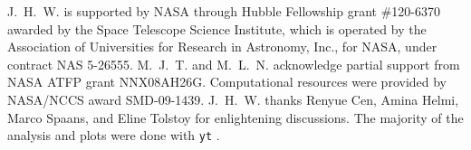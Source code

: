 \documentclass[apjl]{emulateapj}
\begin{document}
\acknowledgments

J.~H.~W. is supported by NASA through Hubble Fellowship grant
\#120-6370 awarded by the Space Telescope Science Institute, which is
operated by the Association of Universities for Research in Astronomy,
Inc., for NASA, under contract NAS 5-26555.  M.~J.~T. and
M.~L.~N. acknowledge partial support from NASA ATFP grant NNX08AH26G.
Computational resources were provided by NASA/NCCS award SMD-09-1439.
J.~H.~W. thanks Renyue Cen, Amina Helmi, Marco Spaans, and Eline
Tolstoy for enlightening discussions.  The majority of the analysis
and plots were done with \texttt{yt} \citep{yt_full_paper}.

%

\end{document}
